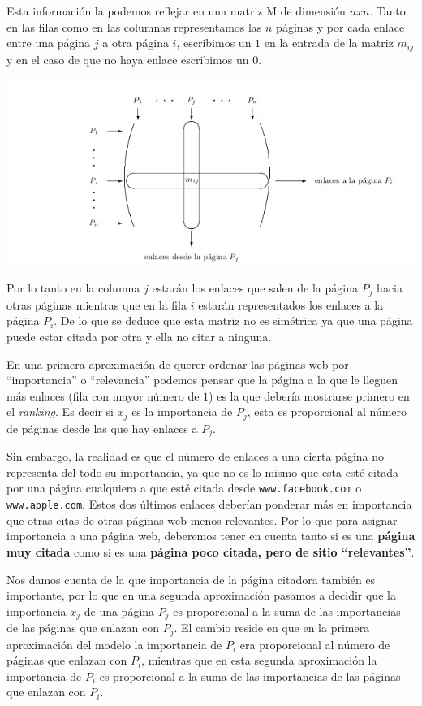 \documentclass[size=a4, parskip=half, titlepage=false, toc=flat, toc=bib, 12pt]{scrartcl}
\theoremstyle{theorem-style}
\theoremstyle{definition-style}
\theoremstyle{remark-style}
\theoremstyle{example-style}
\theoremstyle{definition-style}
\theoremstyle{remark-style}
\begin{document}
Esta información la podemos reflejar en una matriz M de dimensión $nxn$. Tanto en las filas como en las columnas representamos las $n$ páginas y por cada enlace entre una página $j$ a otra página $i$, escribimos un $1$ en la entrada de la
matriz $m_{ij}$ y en el caso de que no haya enlace escribimos un $0$.

\includegraphics[width=1.0\textwidth]{./img/matriz}

Por lo tanto en la columna $j$ estarán los enlaces que salen de la página $P_j$ hacia otras páginas
mientras que en la fila $i$ estarán representados los enlaces a la página $P_i$. De lo que se deduce que esta matriz
no es simétrica ya que una página puede estar citada por otra y ella no citar a ninguna.

En una primera aproximación de querer ordenar las páginas web por ``importancia'' o ``relevancia'' podemos
pensar que la página a la que le lleguen más enlaces (fila con mayor número de $1$) es la que debería
mostrarse primero en el \textit{ranking}. Es decir si $x_j$ es la importancia de $P_j$, esta es proporcional
al número de páginas desde las que hay enlaces a $P_j$.

Sin embargo, la realidad es que el número de enlaces a una cierta página no representa del todo su importancia,
ya que no es lo mismo que esta esté citada por una página cualquiera a que esté citada desde \verb|www.facebook.com| o
\verb|www.apple.com|. Estos dos últimos enlaces deberían ponderar más en importancia que otras citas de
otras páginas web menos relevantes. Por lo que para asignar importancia a una página web, deberemos tener
en cuenta tanto si es una \textbf{página muy citada} como si es una \textbf{página poco citada, pero de sitio ``relevantes''}.

Nos damos cuenta de la que importancia de la página citadora también es importante, por lo que en una segunda aproximación pasamos a decidir que la importancia $x_j$ de una página $P_j$ es proporcional a la suma de las importancias de las páginas que enlazan con $P_j$. El cambio reside en que en la primera aproximación del modelo la importancia de $P_i$ era proporcional al número de páginas que enlazan con $P_i$, mientras que en esta segunda aproximación la importancia de $P_i$ es proporcional a la suma de las importancias de las páginas que enlazan con $P_i$.
\end{document}
